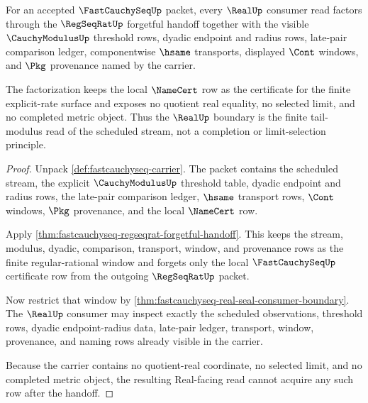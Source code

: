 \begin{theorem}
\label{thm:fastcauchyseq-tail-modulus-real-boundary}
For an accepted $\FastCauchySeqUp$ packet, every $\RealUp$ consumer read
factors through the $\RegSeqRatUp$ forgetful handoff together with the visible
$\CauchyModulusUp$ threshold rows, dyadic endpoint and radius rows, late-pair
comparison ledger, componentwise $\hsame$ transports, displayed $\Cont$
windows, and $\Pkg$ provenance named by the carrier.

The factorization keeps the local $\NameCert$ row as the certificate for the
finite explicit-rate surface and exposes no quotient real equality, no
selected limit, and no completed metric object. Thus the $\RealUp$ boundary is
the finite tail-modulus read of the scheduled stream, not a completion or
limit-selection principle.
\end{theorem}
\begin{proof}
Unpack \autoref{def:fastcauchyseq-carrier}. The packet contains the scheduled
stream, the explicit $\CauchyModulusUp$ threshold table, dyadic endpoint and
radius rows, the late-pair comparison ledger, $\hsame$ transport rows, $\Cont$
windows, $\Pkg$ provenance, and the local $\NameCert$ row.

Apply \autoref{thm:fastcauchyseq-regseqrat-forgetful-handoff}. This keeps the
stream, modulus, dyadic, comparison, transport, window, and provenance rows as
the finite regular-rational window and forgets only the local
$\FastCauchySeqUp$ certificate row from the outgoing $\RegSeqRatUp$ packet.

Now restrict that window by
\autoref{thm:fastcauchyseq-real-seal-consumer-boundary}. The $\RealUp$
consumer may inspect exactly the scheduled observations, threshold rows,
dyadic endpoint-radius data, late-pair ledger, transport, window, provenance,
and naming rows already visible in the carrier.

Because the carrier contains no quotient-real coordinate, no selected limit,
and no completed metric object, the resulting Real-facing read cannot acquire
any such row after the handoff.
\end{proof}

